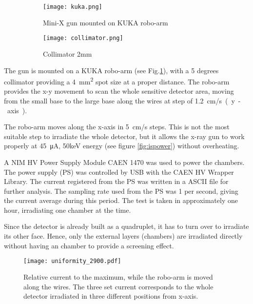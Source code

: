 \begin{figure}
	\centering
	\hspace*{\fill}
	{\begin{subfigure}[b]{0.4\textwidth}
	\centering
	\texttt{[image: kuka.png]}
	\caption{Mini-X gun mounted on KUKA robo-arm}\label{fig:kuka}
	\end{subfigure}
	}
	\hfill
	{
	\begin{subfigure}[b]{0.4\textwidth}
	\centering
	\texttt{[image: collimator.png]}
		\caption{Collimator 2mm}\label{fig:collimator}
	\end{subfigure}
	}
	\hspace*{\fill}
	\caption{}\label{}
\end{figure}

The gun is mounted on a KUKA robo-arm (see Fig.\ref{fig:kuka}), with a 5 degrees collimator providing a \SI{4}{mm^2}
spot size at a proper distance. The robo-arm provides the x-y movement to scan the whole sensitive detector area, moving
from the small base to the large base along the wires at step of \SI{1.2}{cm/s (y-axis)}.\par

The robo-arm moves along the x-axis in \SI{5}{cm/s} steps.  This is not the most suitable step to irradiate the whole
detector, but it allows the x-ray gun to work properly at \SI{45}{\micro A}, 50keV energy (see figure \ref{fig:ispower})
without overheating.\par

A NIM HV Power Supply Module CAEN 1470 was used to power the chambers. The power supply (PS) was controlled by USB with
the CAEN HV Wrapper Library. The current registered from the PS was written in a ASCII file for further analysis. The
sampling rate used from the PS was 1 per second, giving the current average during this period.  The test is taken in
approximately one hour, irradiating one chamber at the time.\par

Since the detector is already built as a quadruplet, it has to turn over to irradiate its other face. Hence, only
the external layers (chambers) are irradiated directly without having an chamber to provide a screening effect.\par

\begin{figure}[ht]
	\centering
		\hspace*{\fill}
	\texttt{[image: uniformity\_2900.pdf]}
		\hspace*{\fill}
		\captionsetup{margin=1cm}
	\caption{Relative current to the maximum, while the robo-arm is moved along the wires. The three set current
	corresponds to the whole detector irradiated in three different positions from x-axis.}\label{}
\end{figure}


